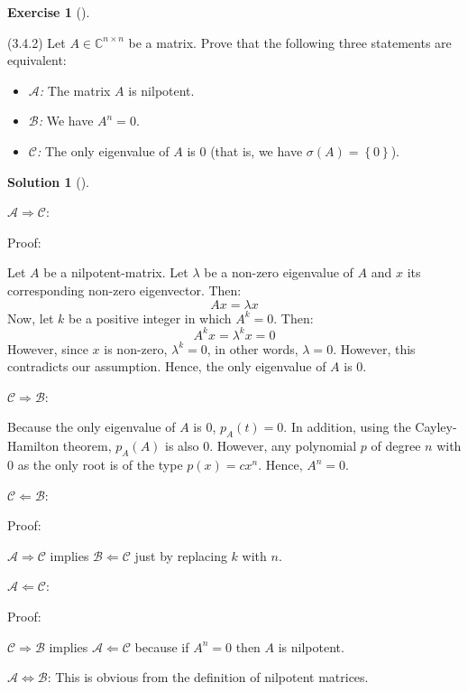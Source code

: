 \documentclass[numbers=enddot,12pt,final,onecolumn,notitlepage]{scrartcl}
\newcounter{exer}
\newcounter{sol}
\theoremstyle{definition}
\newtheorem{exmp}[exer]{Exercise}
\newenvironment{exercise}[1][]
{\begin{exmp}[#1]\begin{leftbar}}
        {\end{leftbar}\end{exmp}}
\newtheorem{solu}[sol]{Solution}
\newenvironment{solution}[1][]
{\begin{solu}[#1]\begin{leftbar}}
        {\end{leftbar}\end{solu}}
\begin{document}
\begin{exercise}
	\label{exe.jnf.step3.An=0} (3.4.2) Let $A\in\mathbb{C}^{n\times n}$ be a
	matrix. Prove that the following three statements are equivalent:

	\begin{itemize}
		\item $\mathcal{A}$\textit{:} The matrix $A$ is nilpotent.

		\item $\mathcal{B}$\textit{:} We have $A^{n}=0$.

		\item $\mathcal{C}$\textit{:} The only eigenvalue of $A$ is $0$ (that is, we
		      have $\sigma\left(  A\right)  =\left\{  0\right\}  $).
	\end{itemize}
\end{exercise}

\begin{solution}
	$\mathcal{A}\Longrightarrow\mathcal{C}$:

	Proof:

	Let $A$ be a nilpotent-matrix. Let $\lambda$ be a non-zero eigenvalue of $A$ and $x$ its corresponding non-zero eigenvector. Then:
	\[
		Ax = \lambda x
	\]
	Now, let $k$ be a positive integer in which $A^k = 0$. Then:
	\[
		A^kx = \lambda^kx = 0
	\]
	However, since $x$ is non-zero, $\lambda^k = 0$, in other words, $\lambda = 0$. However, this contradicts our assumption. Hence, the only eigenvalue of $A$ is 0.

	$\mathcal{C}\Longrightarrow\mathcal{B}$:

	Because the only eigenvalue of $A$ is 0, $p_A(t) = 0$. In addition, using the Cayley-Hamilton theorem, $p_A(A)$ is also 0. However, any polynomial $p$ of degree $n$ with 0 as the only root is of the type $p(x)=cx^n$. Hence, $A^n=0$.

	$\mathcal{C}\Longleftarrow\mathcal{B}$:

	Proof:

	$\mathcal{A}\Longrightarrow\mathcal{C}$ implies $\mathcal{B}\Longleftarrow\mathcal{C}$ just by replacing $k$ with $n$.

	$\mathcal{A}\Longleftarrow\mathcal{C}$:

	Proof:

	$\mathcal{C}\Longrightarrow\mathcal{B}$ implies $\mathcal{A}\Longleftarrow\mathcal{C}$ because if $A^n = 0$ then $A$ is nilpotent.

	$\mathcal{A}\Longleftrightarrow\mathcal{B}$: This is obvious from the definition of nilpotent matrices.

\end{solution}
\end{document}
